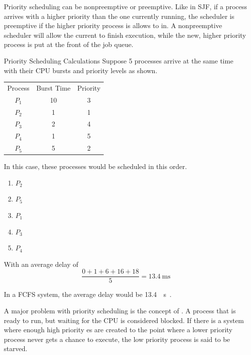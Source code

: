 Priority scheduling can be nonpreemptive or preemptive.
Like in SJF, if a process arrives with a higher priority than the one currently running, the scheduler is preemptive if the higher priority process is allows to  in.
A nonpreemptive scheduler will allow the current  to finish execution, while the new, higher priority process is put at the front of the job queue.

\begin{example}[]{Priority Scheduling Calculations}
  Suppose 5 processes arrive at the same time with their CPU bursts and priority levels as shown.
  \begin{center}
    \begin{tabular}{ccc}
      \toprule
      Process & Burst Time & Priority \\
      $P_{1}$ & 10 & 3 \\
      $P_{2}$ & 1 & 1 \\
      $P_{3}$ & 2 & 4 \\
      $P_{4}$ & 1 & 5 \\
      $P_{5}$ & 5 & 2 \\
      \bottomrule
    \end{tabular}
  \end{center}
  \tcblower{}
  In this case, these processes would be scheduled in this order.
  \begin{enumerate}[noitemsep]
  \item $P_{2}$
  \item $P_{5}$
  \item $P_{1}$
  \item $P_{3}$
  \item $P_{4}$
  \end{enumerate}
  With an average delay of
  \begin{equation*}
    \frac{0+1+6+16+18}{5} = \SI{13.4}{\milli \second}
  \end{equation*}

  In a FCFS system, the average delay would be \SI{13.4}{\milli{} \second{}}.
\end{example}

A major problem with priority scheduling is the concept of .
A process that is ready to run, but waiting for the CPU is considered blocked.
If there is a system where enough high priority es are created to the point where a lower priority process never gets a chance to execute, the low priority process is said to be starved.

